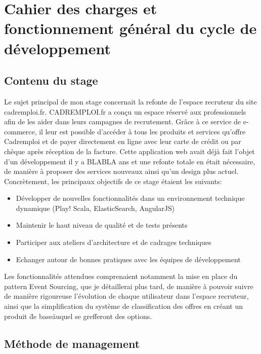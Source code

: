 \section{Cahier des charges et fonctionnement général du cycle de développement}
\subsection{Contenu du stage}
\label{sub:Contenu du stage}

Le sujet principal de mon stage concernait la refonte de l'espace recruteur du site cadremploi.fr.
CADREMPLOI.fr a conçu un espace réservé aux professionnels afin de les aider dans leurs campagnes de recrutement.
Grâce à ce service de e-commerce, il leur est possible d'accéder à tous les produits et services qu'offre Cadremploi et de payer directement en ligne avec leur carte de crédit ou par chèque après réception de la facture.
Cette application web avait déjà fait l'objet d'un développement il y a BLABLA ans et une refonte totale en était nécessaire, de manière à proposer des services nouveaux ainsi qu'un design plus actuel.
Concrètement, les principaux objectifs de ce stage étaient les suivants:
\begin{itemize}
  \item{} Développer de nouvelles fonctionnalités dans un environnement technique dynamique (Play! Scala, ElasticSearch, AngularJS)
  \item{} Maintenir le haut niveau de qualité et de tests présents
  \item{} Participer aux ateliers d'architecture et de cadrages techniques
  \item{} Echanger autour de bonnes pratiques avec les équipes de développement
\end{itemize}
Les fonctionnalités attendues comprenaient notamment la mise en place du pattern Event Sourcing, que je détaillerai plus tard, de manière à pouvoir suivre de manière rigoureuse l'évolution de chaque utilisateur dans l'espace recruteur, ainsi que la simplification du système de classification des offres en créant un produit \"de base\" auquel se grefferont des options.

\subsection{Méthode de management}
\label{sub:Méthode de management}
